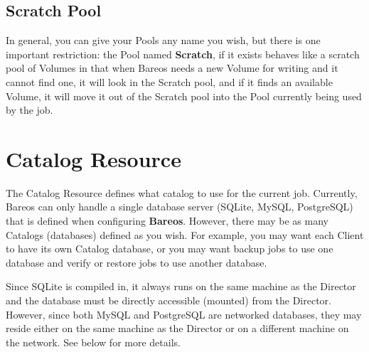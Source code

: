 \subsection{Scratch Pool}
\label{TheScratchPool}

In general, you can give your Pools any name you wish, but there is one
important restriction: the Pool named {\bf Scratch}, if it exists behaves
like a scratch pool of Volumes in that when Bareos needs a new Volume for
writing and it cannot find one, it will look in the Scratch pool, and if
it finds an available Volume, it will move it out of the Scratch pool into
the Pool currently being used by the job.

\section{Catalog Resource}
\label{CatalogResource}

The Catalog Resource defines what catalog to use for the current job.
Currently, Bareos can only handle a single database server (SQLite, MySQL,
PostgreSQL) that is defined when configuring {\bf Bareos}.  However, there
may be as many Catalogs (databases) defined as you wish.  For example, you
may want each Client to have its own Catalog database, or you may want
backup jobs to use one database and verify or restore jobs to use another
database.

Since SQLite is compiled in, it always runs on the same machine
as the Director and the database must be directly accessible (mounted) from
the Director.  However, since both MySQL and PostgreSQL are networked
databases, they may reside either on the same machine as the Director
or on a different machine on the network.  See below for more details.


